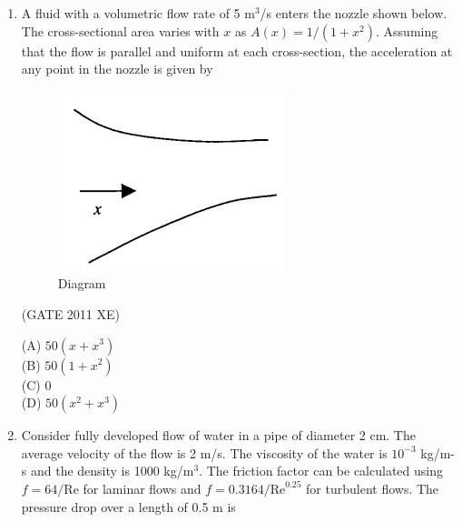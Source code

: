 \documentclass[journal,12pt,onecolumn]{IEEEtran}
\begin{document}
\begin{enumerate}
\begin{enumerate}
\begin{enumerate}
\hfill{(GATE 2011 XE)} \\
\begin{multicols}{4}
(A) 9215 N\\
(B) 10000 N\\
(C) 10785 N\\
(D) 12500 N
\end{multicols}

\newpage

\item A fluid with a volumetric flow rate of 5 m$^3$/s enters the nozzle shown below. The cross-sectional area varies with $x$ as $A(x) = 1/(1+x^2)$. Assuming that the flow is parallel and uniform at each cross-section, the acceleration at any point in the nozzle is given by\\

\begin{figure}[htbp]
  \centering
  \includegraphics[width=.65\columnwidth]{figs/B/fig3.png}
  \caption{Diagram}
  \label{fig:figs/B/fig3.png}
\end{figure}

\hfill{(GATE 2011 XE)} \\
\begin{multicols}{4}
(A) $50(x + x^3)$\\
(B) $50(1 + x^2)$\\
(C) $0$\\
(D) $50(x^2 + x^3)$
\end{multicols}

\item Consider fully developed flow of water in a pipe of diameter 2 cm. The average velocity of the flow is 2 m/s. The viscosity of the water is $10^{-3}$ kg/m-s and the density is 1000 kg/m$^3$. The friction factor can be calculated using $f = 64/\mathrm{Re}$ for laminar flows and $f = 0.3164/\mathrm{Re}^{0.25}$ for turbulent flows. The pressure drop over a length of 0.5 m is\\


\end{enumerate}
\end{enumerate}
\end{enumerate}
\end{document}
